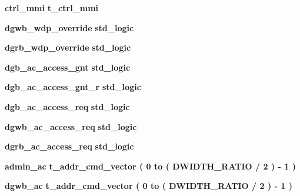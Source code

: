 \begin{DoxyCompactItemize}
{\bf ctrl\+\_\+mmi} {\bfseries \textcolor{vhdlchar}{t\+\_\+ctrl\+\_\+mmi}\textcolor{vhdlchar}{ }} 
\item 
{\bf dgwb\+\_\+wdp\+\_\+override} {\bfseries \textcolor{comment}{std\+\_\+logic}\textcolor{vhdlchar}{ }} 
\item 
{\bf dgrb\+\_\+wdp\+\_\+override} {\bfseries \textcolor{comment}{std\+\_\+logic}\textcolor{vhdlchar}{ }} 
\item 
{\bf dgb\+\_\+ac\+\_\+access\+\_\+gnt} {\bfseries \textcolor{comment}{std\+\_\+logic}\textcolor{vhdlchar}{ }} 
\item 
{\bf dgb\+\_\+ac\+\_\+access\+\_\+gnt\+\_\+r} {\bfseries \textcolor{comment}{std\+\_\+logic}\textcolor{vhdlchar}{ }} 
\item 
{\bf dgb\+\_\+ac\+\_\+access\+\_\+req} {\bfseries \textcolor{comment}{std\+\_\+logic}\textcolor{vhdlchar}{ }} 
\item 
{\bf dgwb\+\_\+ac\+\_\+access\+\_\+req} {\bfseries \textcolor{comment}{std\+\_\+logic}\textcolor{vhdlchar}{ }} 
\item 
{\bf dgrb\+\_\+ac\+\_\+access\+\_\+req} {\bfseries \textcolor{comment}{std\+\_\+logic}\textcolor{vhdlchar}{ }} 
\item 
{\bf admin\+\_\+ac} {\bfseries \textcolor{vhdlchar}{t\+\_\+addr\+\_\+cmd\+\_\+vector}\textcolor{vhdlchar}{ }\textcolor{vhdlchar}{(}\textcolor{vhdlchar}{ }\textcolor{vhdlchar}{ } \textcolor{vhdldigit}{0} \textcolor{vhdlchar}{ }\textcolor{keywordflow}{to}\textcolor{vhdlchar}{ }\textcolor{vhdlchar}{(}\textcolor{vhdlchar}{ }\textcolor{vhdlchar}{ }\textcolor{vhdlchar}{ }\textcolor{vhdlchar}{ }{\bfseries {\bf D\+W\+I\+D\+T\+H\+\_\+\+R\+A\+T\+IO}} \textcolor{vhdlchar}{/}\textcolor{vhdlchar}{ } \textcolor{vhdldigit}{2} \textcolor{vhdlchar}{ }\textcolor{vhdlchar}{)}\textcolor{vhdlchar}{ }\textcolor{vhdlchar}{-\/}\textcolor{vhdlchar}{ } \textcolor{vhdldigit}{1} \textcolor{vhdlchar}{ }\textcolor{vhdlchar}{)}\textcolor{vhdlchar}{ }} 
\item 
{\bf dgwb\+\_\+ac} {\bfseries \textcolor{vhdlchar}{t\+\_\+addr\+\_\+cmd\+\_\+vector}\textcolor{vhdlchar}{ }\textcolor{vhdlchar}{(}\textcolor{vhdlchar}{ }\textcolor{vhdlchar}{ } \textcolor{vhdldigit}{0} \textcolor{vhdlchar}{ }\textcolor{keywordflow}{to}\textcolor{vhdlchar}{ }\textcolor{vhdlchar}{(}\textcolor{vhdlchar}{ }\textcolor{vhdlchar}{ }\textcolor{vhdlchar}{ }\textcolor{vhdlchar}{ }{\bfseries {\bf D\+W\+I\+D\+T\+H\+\_\+\+R\+A\+T\+IO}} \textcolor{vhdlchar}{/}\textcolor{vhdlchar}{ } \textcolor{vhdldigit}{2} \textcolor{vhdlchar}{ }\textcolor{vhdlchar}{)}\textcolor{vhdlchar}{ }\textcolor{vhdlchar}{-\/}\textcolor{vhdlchar}{ } \textcolor{vhdldigit}{1} \textcolor{vhdlchar}{ }\textcolor{vhdlchar}{)}\textcolor{vhdlchar}{ }} 

\end{DoxyCompactItemize}

